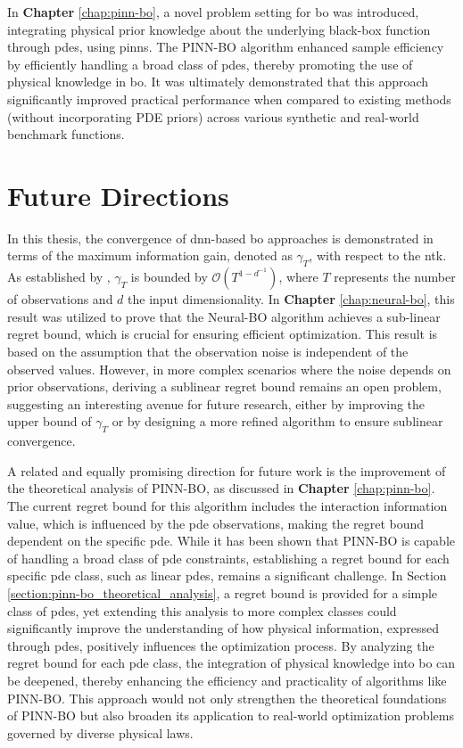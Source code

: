 In \textbf{Chapter} \ref{chap:pinn-bo}, a novel problem setting for \ac{bo} was introduced, integrating physical prior knowledge about the underlying black-box function through \acp{pde}, using \acp{pinn}. The PINN-BO algorithm enhanced sample efficiency by efficiently handling a broad class of \acp{pde}, thereby promoting the use of physical knowledge in \ac{bo}. It was ultimately demonstrated that this approach significantly improved practical performance when compared to existing methods (without incorporating PDE priors) across various synthetic and real-world benchmark functions.
 
\section{Future Directions}
In this thesis, the convergence of \ac{dnn}-based \ac{bo} approaches is demonstrated in terms of the maximum information gain, denoted as $\gamma_T$, with respect to the \ac{ntk}. As established by \citet{kassraie2022neural}, $\gamma_T$ is bounded by $\mathcal{O}(T^{1-d^{-1}})$, where $T$ represents the number of observations and $d$ the input dimensionality. In \textbf{Chapter} \ref{chap:neural-bo}, this result was utilized to prove that the Neural-BO algorithm achieves a sub-linear regret bound, which is crucial for ensuring efficient optimization. This result is based on the assumption that the observation noise is independent of the observed values. However, in more complex scenarios where the noise depends on prior observations, deriving a sublinear regret bound remains an open problem, suggesting an interesting avenue for future research, either by improving the upper bound of $\gamma_T$ or by designing a more refined algorithm to ensure sublinear convergence.

A related and equally promising direction for future work is the improvement of the theoretical analysis of PINN-BO, as discussed in \textbf{Chapter} \ref{chap:pinn-bo}. The current regret bound for this algorithm includes the interaction information value, which is influenced by the \ac{pde} observations, making the regret bound dependent on the specific \ac{pde}. While it has been shown that PINN-BO is capable of handling a broad class of \ac{pde} constraints, establishing a regret bound for each specific \ac{pde} class, such as linear \acp{pde}, remains a significant challenge. In Section \ref{section:pinn-bo_theoretical_analysis}, a regret bound is provided for a simple class of \acp{pde}, yet extending this analysis to more complex classes could significantly improve the understanding of how physical information, expressed through \acp{pde}, positively influences the optimization process. By analyzing the regret bound for each \ac{pde} class, the integration of physical knowledge into \acl{bo} can be deepened, thereby enhancing the efficiency and practicality of algorithms like PINN-BO. This approach would not only strengthen the theoretical foundations of PINN-BO but also broaden its application to real-world optimization problems governed by diverse physical laws.      
